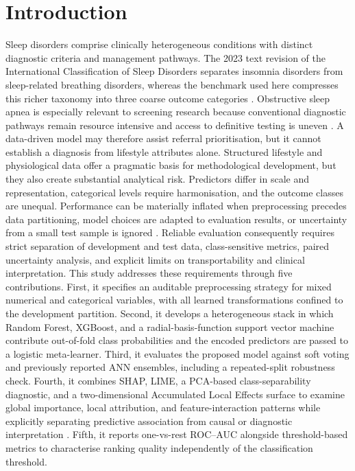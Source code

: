 \documentclass{elektr}
\begin{document}
\section{Introduction}
Sleep disorders comprise clinically heterogeneous conditions with distinct diagnostic criteria and management pathways. The 2023 text revision of the International Classification of Sleep Disorders separates insomnia disorders from sleep-related breathing disorders, whereas the benchmark used here compresses this richer taxonomy into three coarse outcome categories \cite{aasm2023}. Obstructive sleep apnea is especially relevant to screening research because conventional diagnostic pathways remain resource intensive and access to definitive testing is uneven \cite{korkalainen2024,giorgi2025,bazoukis2023}. A data-driven model may therefore assist referral prioritisation, but it cannot establish a diagnosis from lifestyle attributes alone.
Structured lifestyle and physiological data offer a pragmatic basis for methodological development, but they also create substantial analytical risk. Predictors differ in scale and representation, categorical levels require harmonisation, and the outcome classes are unequal. Performance can be materially inflated when preprocessing precedes data partitioning, model choices are adapted to evaluation results, or uncertainty from a small test sample is ignored \cite{kapoor2023,efthimiou2024,collins2024}. Reliable evaluation consequently requires strict separation of development and test data, class-sensitive metrics, paired uncertainty analysis, and explicit limits on transportability and clinical interpretation.
This study addresses these requirements through five contributions. First, it specifies an auditable preprocessing strategy for mixed numerical and categorical variables, with all learned transformations confined to the development partition. Second, it develops a heterogeneous stack in which Random Forest, XGBoost, and a radial-basis-function support vector machine contribute out-of-fold class probabilities and the encoded predictors are passed to a logistic meta-learner. Third, it evaluates the proposed model against soft voting and previously reported ANN ensembles, including a repeated-split robustness check. Fourth, it combines SHAP, LIME, a PCA-based class-separability diagnostic, and a two-dimensional Accumulated Local Effects surface to examine global importance, local attribution, and feature-interaction patterns while explicitly separating predictive association from causal or diagnostic interpretation \cite{jung2023,allen2024,pesapane2026}. Fifth, it reports one-vs-rest ROC--AUC alongside threshold-based metrics to characterise ranking quality independently of the classification threshold.
\end{document}
